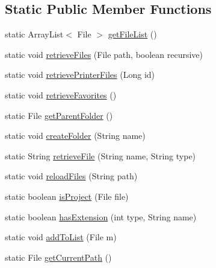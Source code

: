 \subsection*{Static Public Member Functions}
\begin{DoxyCompactItemize}
\item 
static Array\+List$<$ File $>$ \hyperlink{classandroid_1_1app_1_1printerapp_1_1library_1_1_library_controller_ac40d19f25237f4c7d3d55050362fe3bb}{get\+File\+List} ()
\item 
static void \hyperlink{classandroid_1_1app_1_1printerapp_1_1library_1_1_library_controller_a391347667109de15ffd0d27d61ee9a4b}{retrieve\+Files} (File path, boolean recursive)
\item 
static void \hyperlink{classandroid_1_1app_1_1printerapp_1_1library_1_1_library_controller_abcb1adb002ba87668dae4f619c69d081}{retrieve\+Printer\+Files} (Long id)
\item 
static void \hyperlink{classandroid_1_1app_1_1printerapp_1_1library_1_1_library_controller_ab93290047f5c73f7cfbf83e2b802c854}{retrieve\+Favorites} ()
\item 
static File \hyperlink{classandroid_1_1app_1_1printerapp_1_1library_1_1_library_controller_a5a0008e035ae6acc92b3d11dd15a08b8}{get\+Parent\+Folder} ()
\item 
static void \hyperlink{classandroid_1_1app_1_1printerapp_1_1library_1_1_library_controller_a73c60f54ab0dcd094e5aae6dff2f7819}{create\+Folder} (String name)
\item 
static String \hyperlink{classandroid_1_1app_1_1printerapp_1_1library_1_1_library_controller_ae3b5e2319a256af21f32d3e759417ce6}{retrieve\+File} (String name, String type)
\item 
static void \hyperlink{classandroid_1_1app_1_1printerapp_1_1library_1_1_library_controller_a553be4a31201b0e3ad32d3ee4719adb2}{reload\+Files} (String path)
\item 
static boolean \hyperlink{classandroid_1_1app_1_1printerapp_1_1library_1_1_library_controller_ae71c812f2b6e537ca0fc44166031f3ec}{is\+Project} (File file)
\item 
static boolean \hyperlink{classandroid_1_1app_1_1printerapp_1_1library_1_1_library_controller_a1cbfad5c099fcebab104018ed1f1f8e8}{has\+Extension} (int type, String name)
\item 
static void \hyperlink{classandroid_1_1app_1_1printerapp_1_1library_1_1_library_controller_aae6b01fe8d2a566a575ca2bb0997a172}{add\+To\+List} (File m)
\item 
static File \hyperlink{classandroid_1_1app_1_1printerapp_1_1library_1_1_library_controller_a6a8713dc66e33af789348d793d1033e3}{get\+Current\+Path} ()

\end{DoxyCompactItemize}
